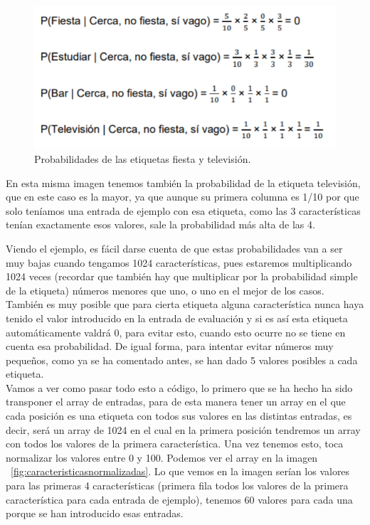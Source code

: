 \documentclass[a4paper, 12pt]{book}
\begin{document}
\begin{figure}
	\centering
	\includegraphics[width=12cm, keepaspectratio]{img/probabilidadesbayes}
	\caption{Probabilidades de las etiquetas fiesta y televisión.}			
	\label{fig:probabilidadesbayes}
\end{figure}

En esta misma imagen tenemos también la probabilidad de la etiqueta televisión, que en este caso es la mayor, ya que aunque su primera columna es 1/10 por que solo teníamos una entrada de ejemplo con esa etiqueta, como las 3 características tenían exactamente esos valores, sale la probabilidad más alta de las 4.

Viendo el ejemplo, es fácil darse cuenta de que estas probabilidades van a ser muy bajas cuando tengamos 1024 características, pues estaremos multiplicando 1024 veces (recordar que también hay que multiplicar por la probabilidad simple de la etiqueta) números menores que uno, o uno en el mejor de los casos.
También es muy posible que para cierta etiqueta alguna característica nunca haya tenido el valor introducido en la entrada de evaluación y si es así esta etiqueta automáticamente valdrá 0, para evitar esto, cuando esto ocurre no se tiene en cuenta esa probabilidad. De igual forma, para intentar evitar números muy pequeños, como ya se ha comentado antes, se han dado 5 valores posibles a cada etiqueta. \\
Vamos a ver como pasar todo esto a código, lo primero que se ha hecho ha sido transponer el array de entradas, para de esta manera tener un array en el que cada posición es una etiqueta con todos sus valores en las distintas entradas, es decir, será un array de 1024 en el cual en la primera posición tendremos un array con todos los valores de la primera característica. Una vez tenemos esto, toca normalizar los valores entre 0 y 100. Podemos ver el array en la imagen 
~\ref{fig:caracteristicasnormalizadas}. Lo que vemos en la imagen serían los valores para las primeras 4 características (primera fila todos los valores de la primera característica para cada entrada de ejemplo), tenemos 60 valores para cada una porque se han introducido esas entradas.
\end{document}
